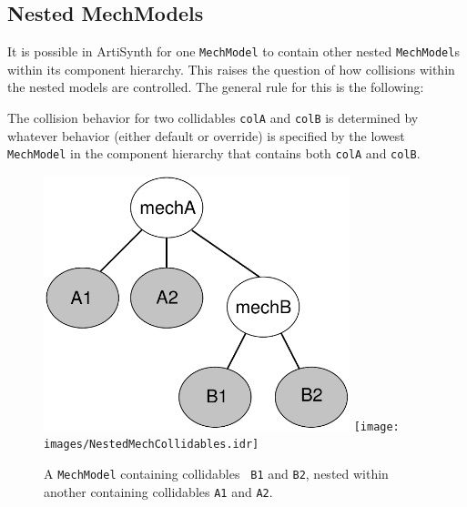 \subsection{Nested MechModels}

It is possible in ArtiSynth for one {\tt MechModel} to contain other
nested {\tt MechModel}s within its component hierarchy. This raises
the question of how collisions within the nested models are
controlled. The general rule for this is the following:

\begin{sideblock}
The collision behavior for two collidables {\tt colA} and {\tt colB}
is determined by whatever behavior (either default or override) is
specified by the lowest {\tt MechModel} in the component hierarchy
that contains both {\tt colA} and {\tt colB}.
\end{sideblock}

\begin{figure}[ht]
\begin{center}
 \iflatexml
   \includegraphics[width=3.5in]{images/NestedMechCollidables}
 \else
   \texttt{[image: images/NestedMechCollidables.idr]}
 \fi
\end{center}
\caption{A {\tt MechModel} containing collidables {\tt
B1} and {\tt B2}, nested within another
containing collidables {\tt A1} and {\tt A2}.}
\label{NestedMechCollidables:fig}
\end{figure}

